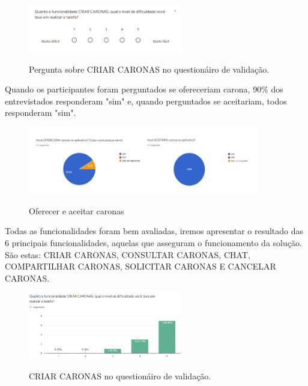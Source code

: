 \begin{figure}[H]
	\centering
	\caption{Pergunta sobre CRIAR CARONAS no questionáiro de validação.}
	\includegraphics[width=0.6\textwidth]{./04-figuras/validacao/perguntas.png}
	\label{fig:perg_criar_caronas}
\end{figure}

Quando os participantes foram perguntados se ofereceriam carona, 90\% dos entrevistados responderam "sim" e, quando perguntados se aceitariam, todos responderam "sim".

\begin{figure}[H]
	\centering
	\caption{Oferecer e aceitar caronas}
	\includegraphics[width=0.9\textwidth]{./04-figuras/validacao/oferecer_aceitar_carona2.png}
	\label{fig:oferecer_aceitar_carona}
\end{figure}

Todas as funcionalidades foram bem avaliadas, iremos apresentar o resultado das 6 principais funcionalidades, aquelas que asseguram o funcionamento da solução. São estas: CRIAR CARONAS, CONSULTAR CARONAS, CHAT, COMPARTILHAR CARONAS, SOLICITAR CARONAS E CANCELAR CARONAS.

\begin{figure}[H]
	\centering
	\caption{CRIAR CARONAS no questionáiro de validação.}
	\includegraphics[width=0.6\textwidth]{./04-figuras/validacao/criar_caronas.png}
	\label{fig:criar_caronas}
\end{figure}

